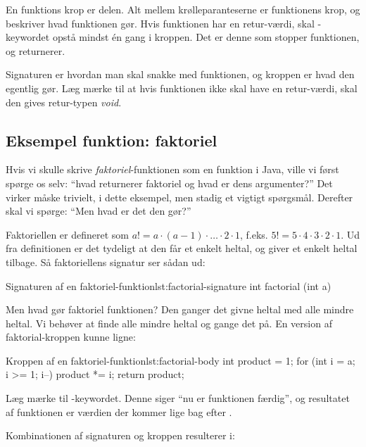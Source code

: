 		En funktions krop er  delen. Alt mellem
		krølleparanteserne er funktionens krop, og beskriver hvad funktionen gør.
		Hvis funktionen har en retur-værdi, skal -keywordet opstå
		mindst én gang i kroppen. Det er denne som stopper funktionen, og returnerer.

        Signaturen er hvordan man skal snakke med funktionen, og
        kroppen er hvad den egentlig gør. Læg mærke til at hvis
        funktionen ikke skal have en retur-værdi, skal den gives
        retur-typen \emph{void}.

	\subsection{Eksempel funktion: faktoriel}

		Hvis vi skulle skrive \emph{faktoriel}-funktionen som en funktion i Java,
		ville vi først spørge os selv: ``hvad returnerer faktoriel og hvad er dens
		argumenter?'' Det virker måske trivielt, i dette eksempel, men stadig et
		vigtigt spørgsmål. Derefter skal vi spørge: ``Men hvad er det den gør?''

		Faktoriellen er defineret som \(a! = a \cdot (a-1) \cdot \dots \cdot 2 \cdot 1\),
		f.eks. \(5! = 5 \cdot 4 \cdot 3 \cdot 2 \cdot 1\). Ud fra definitionen er det
		tydeligt at den får et enkelt heltal, og giver et enkelt heltal tilbage. Så
		faktoriellens signatur ser sådan ud:

		\begin{JavaCode}{Signaturen af en faktoriel-funktion}{lst:factorial-signature}
			int factorial (int a)
		\end{JavaCode}

		Men hvad gør faktoriel funktionen? Den ganger det givne heltal med alle mindre
		heltal. Vi behøver at finde alle mindre heltal og gange det på. En version
		af faktorial-kroppen kunne ligne:

		\begin{JavaCode}{Kroppen af en faktoriel-funktion}{lst:factorial-body}
			int product = 1;
			for (int i = a; i >= 1; i--)
				product *= i;
			return product;
		\end{JavaCode}

        Læg mærke til -keywordet. Denne siger ``nu
        er funktionen færdig'', og resultatet af funktionen er værdien
        der kommer lige bag efter .

		Kombinationen af signaturen og kroppen resulterer i:

